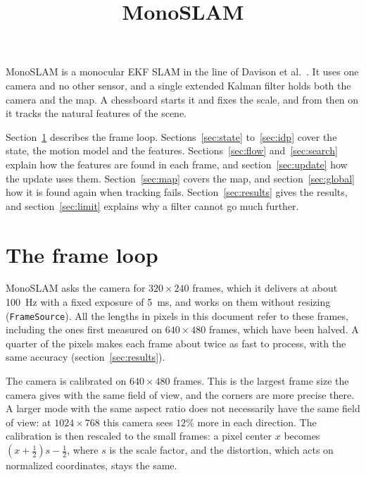 \documentclass[11pt]{article}
\title{MonoSLAM}
\date{}
\begin{document}
\maketitle

MonoSLAM is a monocular EKF SLAM in the line of Davison et al.~\cite{davison2007}. It uses one
camera and no other sensor, and a single extended Kalman filter holds both the camera and the map.
A chessboard starts it and fixes the scale, and from then on it tracks the natural features of the
scene.

Section~\ref{sec:loop} describes the frame loop. Sections~\ref{sec:state} to~\ref{sec:idp} cover
the state, the motion model and the features. Sections~\ref{sec:flow} and~\ref{sec:search} explain
how the features are found in each frame, and section~\ref{sec:update} how the update uses them.
Section~\ref{sec:map} covers the map, and section~\ref{sec:global} how it is found again when
tracking fails. Section~\ref{sec:results} gives the results, and section~\ref{sec:limit} explains
why a filter cannot go much further.

\section{The frame loop}
\label{sec:loop}

MonoSLAM asks the camera for $320 \times 240$ frames, which it delivers at about 100~Hz with a
fixed exposure of 5~ms, and works on them without resizing (\texttt{FrameSource}). All the lengths
in pixels in this document refer to these frames, including the ones first measured on
$640 \times 480$ frames, which have been halved. A quarter of the pixels makes each frame about
twice as fast to process, with the same accuracy (section~\ref{sec:results}).

The camera is calibrated on $640 \times 480$ frames. This is the largest frame size the camera
gives with the same field of view, and the corners are more precise there. A larger mode with the same aspect ratio does not
necessarily have the same field of view: at $1024 \times 768$ this camera sees $12\%$ more in each
direction. The calibration is then rescaled to the small frames: a pixel center $x$ becomes
$(x + \frac{1}{2}) s - \frac{1}{2}$, where $s$ is the scale factor, and the distortion, which acts
on normalized coordinates, stays the same.
\end{document}
